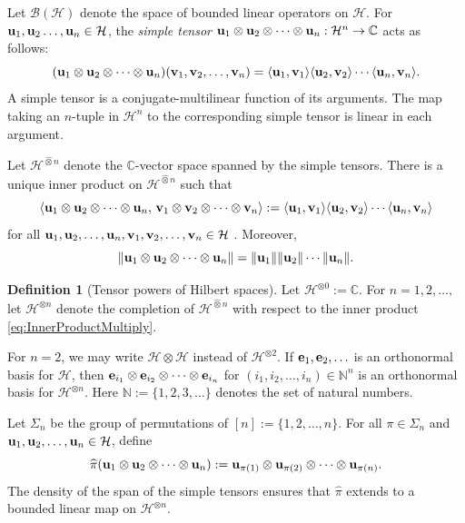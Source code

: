 \documentclass[10pt,reqno]{amsart}
\newcommand{\0}{{\color{lightgray}0}}
\newcommand{\B}{\mathcal{B}}
\newcommand{\C}{\mathbb{C}}
\newcommand{\N}{\mathbb{N}}
\newcommand{\norm}[1]{\| #1 \|}
\newcommand{\h}{\mathcal{H}}
\renewcommand{\hat}{\widehat}
\renewcommand{\vec}[1]{{\bf #1}}
\theoremstyle{definition}
\newtheorem{Definition}[equation]{Definition}
\numberwithin{equation}{section}
\begin{document}
Let $\B(\h)$ denote the space of bounded linear operators on $\h$.
For $\vec{u}_1, \vec{u}_2 \ldots , \vec{u}_n \in \h$, the \emph{simple tensor}
$\vec{u}_1 \otimes \vec{u}_2 \otimes \cdots \otimes \vec{u}_n : \h^n \to \C$ acts as follows:
\begin{equation*}
(\vec{u}_1 \otimes \vec{u}_2 \otimes \cdots \otimes \vec{u}_n)(\vec{v}_1,\vec{v}_2, \ldots, \vec{v}_n)
=\langle \vec{u}_1, \vec{v}_1 \rangle \langle \vec{u}_2, \vec{v}_2 \rangle \cdots \langle \vec{u}_n, \vec{v}_n \rangle.
\end{equation*}
A simple tensor is a conjugate-multilinear function of its arguments.
The map taking an $n$-tuple in $\h^n$ to the corresponding simple tensor is linear in each argument.

Let $\h^{ \hat{\otimes}n}$ denote the $\C$-vector space spanned by the simple tensors.
There is a unique inner product on $\h^{ \hat{\otimes}n} $ such that 
\begin{equation}\label{eq:InnerProductMultiply}
    \langle\vec{u}_1 \otimes \vec{u}_2 \otimes \cdots \otimes  \vec{u}_n, \, \vec{v}_1 \otimes \vec{v}_2 \otimes \cdots \otimes \vec{v}_n \rangle :=\langle \vec{u}_1, \vec{v}_1 \rangle \langle \vec{u}_2, \vec{v}_2 \rangle \cdots\langle \vec{u}_n, \vec{v}_n \rangle
\end{equation}
for all $\vec{u}_1, \vec{u}_2, \ldots, \vec{u}_n ,\vec{v}_1, \vec{v}_2, \ldots, \vec{v}_n\in \h$ \cite[Prop.~3.8.2]{SimonReal}.
Moreover,
\begin{equation*}
\norm{\vec{u}_1 \otimes \vec{u}_2 \otimes \cdots \otimes  \vec{u}_n} = \norm{ \vec{u}_1} \norm{\vec{u}_2} \cdots \norm{ \vec{u}_n}.
\end{equation*}

\begin{Definition}[Tensor powers of Hilbert spaces]
Let $\h^{\otimes 0} := \C$. For $n=1,2,\ldots,$ let $\h^{\otimes n}$ denote 
the completion of $\h^{ \hat{\otimes}n}$ with respect to the inner product \eqref{eq:InnerProductMultiply}. 
\end{Definition}

For $n=2$, we may write $\h\otimes \h$ instead of $\h^{\otimes 2}$.
If $\vec{e}_1, \vec{e}_2,\ldots$ is an orthonormal basis for $\h$, then 
$\vec{e}_{i_1} \otimes \vec{e}_{i_2} \otimes \cdots \otimes \vec{e}_{i_n}$ for $(i_1,i_2,\ldots,i_n) \in \N^n$
is an orthonormal basis for $\h^{\otimes n}$.  Here $\N := \{1,2,3,\ldots\}$ denotes the set of natural numbers.

Let $\Sigma_n$ be the group of permutations of $[n]:=\{1,2, \ldots,n\}$.
For all $\pi \in \Sigma_n$ and $\vec{u}_1,\vec{u}_2, \ldots, \vec{u}_n \in \h$, define
\begin{equation}\label{eq:PiSimple}
\hat{\pi}(\vec{u}_1 \otimes \vec{u}_2 \otimes \cdots \otimes \vec{u}_n )
:=\vec{u}_{\pi (1)} \otimes \vec{u}_{\pi (2)}\otimes \cdots \otimes \vec{u}_{\pi (n)}.
\end{equation}
The density of the span of the simple tensors ensures that $\hat{\pi}$ extends to a bounded linear map on $\h^{\otimes n}$.
\end{document}
